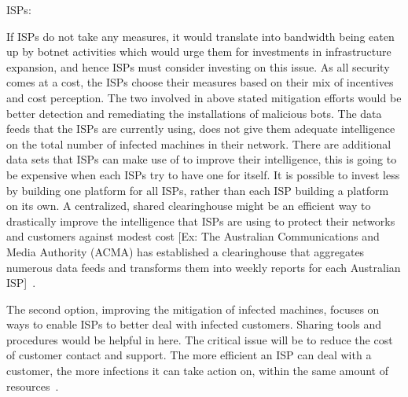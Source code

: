  ISPs:

 If ISPs do not take any measures, it would translate into bandwidth being eaten up by botnet activities which would urge them for investments in infrastructure expansion, and hence ISPs must consider investing on this issue. As all security comes at a cost, the ISPs choose their measures based on their mix of incentives and cost perception. The two involved in above stated mitigation efforts would be better detection and remediating the installations of malicious bots. The data feeds that the ISPs are currently using, does not give them adequate intelligence on the total number of infected machines in their network. There are additional data sets that ISPs can make use of to improve their intelligence, this is going to be expensive when each ISPs try to have one for itself. It is possible to invest less by building one platform for all ISPs, rather than each ISP building a platform on its own. A centralized, shared clearinghouse might be an efficient way to drastically improve the intelligence that ISPs are using to protect their networks and customers against modest cost [Ex: The Australian Communications and Media Authority (ACMA) has established a clearinghouse that aggregates numerous data feeds and transforms them into weekly reports for each Australian ISP]~\cite{asghari2010botnet}.

 The second option, improving the mitigation of infected machines, focuses on ways to enable ISPs to better deal with infected customers. Sharing tools and procedures would be helpful in here. The critical issue will be to reduce the cost of customer contact and support. The more efficient an ISP can deal with a customer, the more infections it can take action on, within the same amount of resources~\cite{asghari2010botnet}.

